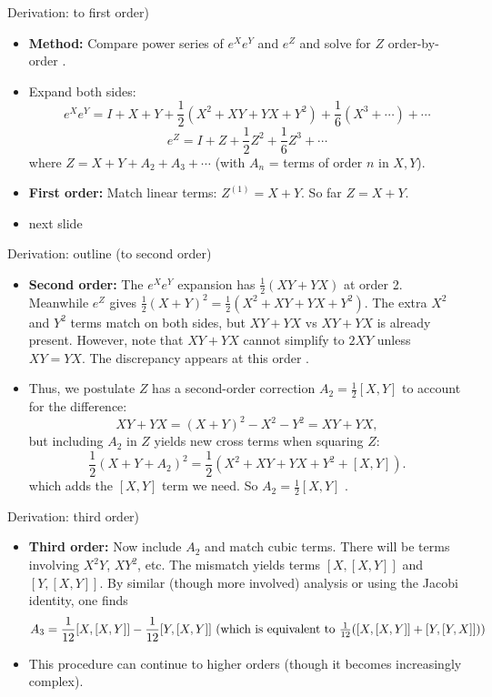 \documentclass{beamer}
\begin{document}
\begin{frame}{Derivation: to first order)}
\begin{itemize}
\item \textbf{Method:} Compare power series of $e^X e^Y$ and $e^Z$ and solve for $Z$ order-by-order .
\item Expand both sides:
\[
e^X e^Y = I + X + Y + \frac{1}{2}(X^2 + XY + YX + Y^2) + \frac{1}{6}(X^3 + \cdots) + \cdots
\]
\[
e^Z = I + Z + \frac{1}{2}Z^2 + \frac{1}{6}Z^3 + \cdots
\]
where $Z = X + Y + A_2 + A_3 + \cdots$ (with $A_n$ = terms of order $n$ in $X,Y$).
\item \textbf{First order:} Match linear terms: $Z^{(1)} = X + Y$. So far $Z = X+Y$.
\item next slide
\end{itemize}
\end{frame}


\begin{frame}{Derivation: outline (to second order)}
\begin{itemize}
\item \textbf{Second order:} The $e^X e^Y$ expansion has $\frac{1}{2}(XY + YX)$ at order 2. Meanwhile $e^Z$ gives $\frac{1}{2}(X+Y)^2 = \frac{1}{2}(X^2 + XY + YX + Y^2)$. The extra $X^2$ and $Y^2$ terms match on both sides, but $XY+YX$ vs $XY+YX$ is already present. However, note that $XY + YX$ cannot simplify to $2XY$ unless $XY=YX$. The discrepancy appears at this order .
\item Thus, we postulate $Z$ has a second-order correction $A_2 = \frac{1}{2}[X,Y]$ to account for the difference:
\[  
XY + YX = (X+Y)^2 - X^2 - Y^2 = XY + YX,
\]
but including $A_2$ in $Z$ yields new cross terms when squaring $Z$:
\[
\frac{1}{2}(X+Y+A_2)^2 = \frac{1}{2}(X^2 + XY+YX + Y^2 + [X,Y]).
\]
which adds the $[X,Y]$ term we need. So $A_2 = \frac{1}{2}[X,Y]$ .
\end{itemize}
\end{frame}



\begin{frame}{Derivation: third order)}
\begin{itemize}
\item \textbf{Third order:} Now include $A_2$ and match cubic terms. There will be terms involving $X^2Y$, $XY^2$, etc. The mismatch yields terms $[X,[X,Y]]$ and $[Y,[X,Y]]$. By similar (though more involved) analysis or using the Jacobi identity, one finds
\[
A_3 = \frac{1}{12}[X,[X,Y]] - \frac{1}{12}[Y,[X,Y]]$ (which is equivalent to $\frac{1}{12}([X,[X,Y]] + [Y,[Y,X]]))
\]
\item This procedure can continue to higher orders (though it becomes increasingly complex).
\end{itemize}
\end{frame}
\end{document}
